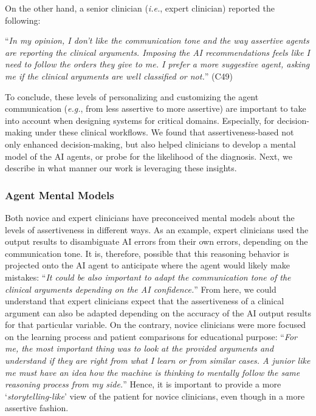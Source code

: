 \noindent
On the other hand, a senior clinician ({\it i.e.}, expert clinician) reported the following:

\vspace{2.5mm}

\noindent
``{\it In my opinion, I don't like the communication tone and the way assertive agents are reporting the clinical arguments. Imposing the AI recommendations feels like I need to follow the orders they give to me. I prefer a more suggestive agent, asking me if the clinical arguments are well classified or not.}'' (C49)

\vspace{2.5mm}

To conclude, these levels of personalizing and customizing the agent communication ({\it e.g.}, from less assertive to more assertive) are important to take into account when designing systems for critical domains.
Especially, for decision-making under these clinical workflows.
We found that assertiveness-based not only enhanced decision-making, but also helped clinicians to develop a mental model of the AI agents, or probe for the likelihood of the diagnosis.
Next, we describe in what manner our work is leveraging these insights.

\subsubsection{Agent Mental Models}
\label{sec:chap006006003002}

Both novice and expert clinicians have preconceived mental models about the levels of assertiveness in different ways.
As an example, expert clinicians used the output results to disambiguate AI errors from their own errors, depending on the communication tone.
It is, therefore, possible that this reasoning behavior is projected onto the AI agent to anticipate where the agent would likely make mistakes: ``{\it It could be also important to adapt the communication tone of the clinical arguments depending on the AI confidence.}''
From here, we could understand that expert clinicians expect that the assertiveness of a clinical argument can also be adapted depending on the accuracy of the AI output results for that particular variable.
On the contrary, novice clinicians were more focused on the learning process and patient comparisons for educational purpose: ``{\it For me, the most important thing was to look at the provided arguments and understand if they are right from what I learn or from similar cases. A junior like me must have an idea how the machine is thinking to mentally follow the same reasoning process from my side.}''
Hence, it is important to provide a more `{\it storytelling-like}' view of the patient for novice clinicians, even though in a more assertive fashion.

